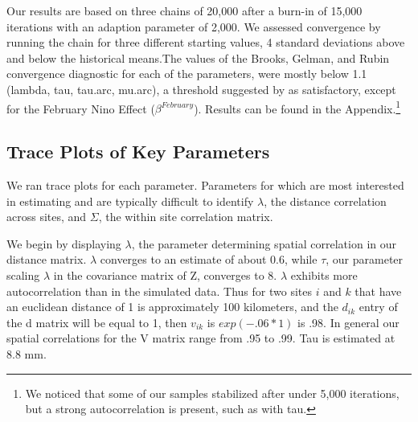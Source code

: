 \documentclass[11pt]{article}
\begin{document}
Our results are based on three chains of 20,000 after a burn-in of 15,000 iterations with an adaption parameter of 2,000. We assessed convergence by running the chain for three different starting values, 4 standard deviations above and below the historical means.The values of the Brooks, Gelman, and Rubin convergence diagnostic for each of the parameters, were mostly below 1.1 (lambda, tau, tau.arc, mu.arc), a threshold suggested by \cite{Gamerman1997} as satisfactory, except for the February Nino Effect ($\beta^{February}$). Results can be found in the Appendix.\footnote{We noticed that some of our samples stabilized after under 5,000 iterations, but a strong autocorrelation is present, such as with tau.}  



\subsection{Trace Plots of Key Parameters}

We ran trace plots for each parameter. Parameters for which are most interested in estimating and are typically difficult to identify $\lambda$, the distance correlation across sites, and $\Sigma$, the within site correlation matrix. 






We begin by displaying $\lambda$, the parameter determining spatial correlation in our distance matrix. $\lambda$ converges to an estimate of about 0.6, while $\tau$, our parameter scaling $\lambda$ in the covariance matrix of Z, converges to 8. $\lambda$ exhibits more autocorrelation than in the simulated data. Thus for two sites $i$ and $k$ that have an euclidean distance of 1 is approximately 100 kilometers, and the $d_{ik}$ entry of the d matrix will be equal to 1, then $v_{ik}$ is $exp(-.06*1)$ is .98. In general our spatial correlations for the V matrix range from .95 to .99. Tau is estimated at 8.8 mm. 
\end{document}

